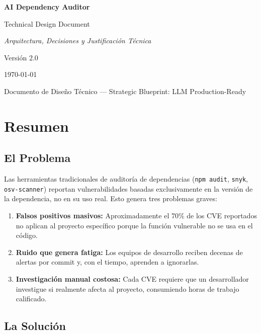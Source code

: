 \documentclass[11pt,a4paper]{article}
\begin{document}
\begin{titlepage}
  \centering
  \vspace*{4cm}
  {\Huge\bfseries AI Dependency Auditor\par}
  \vspace{0.5cm}
  {\Large Technical Design Document\par}
  \vspace{1.5cm}
  {\large\textit{Arquitectura, Decisiones y Justificación Técnica}\par}
  \vspace{2cm}
  {\large Versión 2.0}\par
  {\large \today}\par
  \vfill
  {\small Documento de Diseño Técnico — Strategic Blueprint: LLM Production-Ready\par}
\end{titlepage}

\section{Resumen}

\subsection{El Problema}

Las herramientas tradicionales de auditoría de dependencias (\texttt{npm audit}, \texttt{snyk}, \texttt{osv-scanner}) reportan vulnerabilidades basadas exclusivamente en la versión de la dependencia, no en su uso real. Esto genera tres problemas graves:

\begin{enumerate}
  \item \textbf{Falsos positivos masivos:} Aproximadamente el 70\% de los CVE reportados no aplican al proyecto específico porque la función vulnerable no se usa en el código.
  \item \textbf{Ruido que genera fatiga:} Los equipos de desarrollo reciben decenas de alertas por commit y, con el tiempo, aprenden a ignorarlas.
  \item \textbf{Investigación manual costosa:} Cada CVE requiere que un desarrollador investigue si realmente afecta al proyecto, consumiendo horas de trabajo calificado.
\end{enumerate}

\subsection{La Solución}
\end{document}
